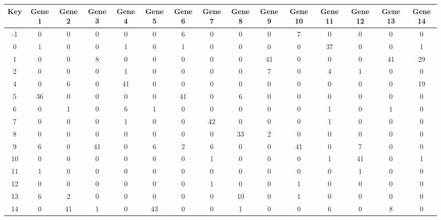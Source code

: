 \begin{tabular}{|c|c|c|c|c|c|c|c|c|c|c|c|c|c|c|}
\hline
Key & Gene 1 & Gene 2 & Gene 3 & Gene 4 & Gene 5 & Gene 6 & Gene 7 & Gene 8 & Gene 9 & Gene 10 & Gene 11 & Gene 12 & Gene 13 & Gene 14 \\
\hline
-1 & 0 & 0 & 0 & 0 & 0 & 6 & 0 & 0 & 0 & 7 & 0 & 0 & 0 & 0 \\
0 & 1 & 0 & 0 & 1 & 0 & 1 & 0 & 0 & 0 & 0 & 37 & 0 & 0 & 1 \\
1 & 0 & 0 & 8 & 0 & 0 & 0 & 0 & 0 & 41 & 0 & 0 & 0 & 41 & 29 \\
2 & 0 & 0 & 0 & 1 & 0 & 0 & 0 & 0 & 7 & 0 & 4 & 1 & 0 & 0 \\
4 & 0 & 6 & 0 & 41 & 0 & 0 & 0 & 0 & 0 & 0 & 0 & 0 & 0 & 19 \\
5 & 36 & 0 & 0 & 0 & 0 & 41 & 0 & 6 & 0 & 0 & 0 & 0 & 0 & 0 \\
6 & 0 & 1 & 0 & 6 & 1 & 0 & 0 & 0 & 0 & 0 & 1 & 0 & 1 & 0 \\
7 & 0 & 0 & 0 & 1 & 0 & 0 & 42 & 0 & 0 & 0 & 1 & 0 & 0 & 0 \\
8 & 0 & 0 & 0 & 0 & 0 & 0 & 0 & 33 & 2 & 0 & 0 & 0 & 0 & 0 \\
9 & 6 & 0 & 41 & 0 & 6 & 2 & 6 & 0 & 0 & 41 & 0 & 7 & 0 & 0 \\
10 & 0 & 0 & 0 & 0 & 0 & 0 & 1 & 0 & 0 & 0 & 1 & 41 & 0 & 1 \\
11 & 1 & 0 & 0 & 0 & 0 & 0 & 0 & 0 & 0 & 0 & 0 & 1 & 0 & 0 \\
12 & 0 & 0 & 0 & 0 & 0 & 0 & 1 & 0 & 0 & 1 & 0 & 0 & 0 & 0 \\
13 & 6 & 2 & 0 & 0 & 0 & 0 & 0 & 10 & 0 & 1 & 0 & 0 & 0 & 0 \\
14 & 0 & 41 & 1 & 0 & 43 & 0 & 0 & 1 & 0 & 0 & 6 & 0 & 8 & 0 \\
\hline
\end{tabular}